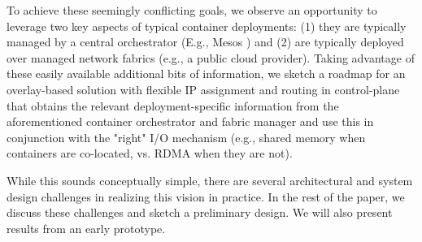 To achieve these seemingly conflicting goals, we observe an opportunity to
leverage two key aspects of typical container deployments: (1) they are
typically managed by a central orchestrator (E.g., Mesos \cite{mesos} ) and (2) are typically
deployed over managed network fabrics (e.g., a public cloud provider). Taking
advantage of these easily available additional bits of information, we sketch a
roadmap for an overlay-based solution  with flexible IP assignment and routing
in control-plane  that obtains the relevant
deployment-specific information from the aforementioned container orchestrator
and fabric manager and use this in conjunction with the "right" I/O mechanism
(e.g., shared memory when containers are co-located, vs. RDMA when they are
not). 

While this sounds conceptually simple, there are several architectural
and system design challenges in realizing this vision in practice. In the rest
of the paper, we discuss these challenges and sketch a preliminary design. We
will also present results from an early prototype.
